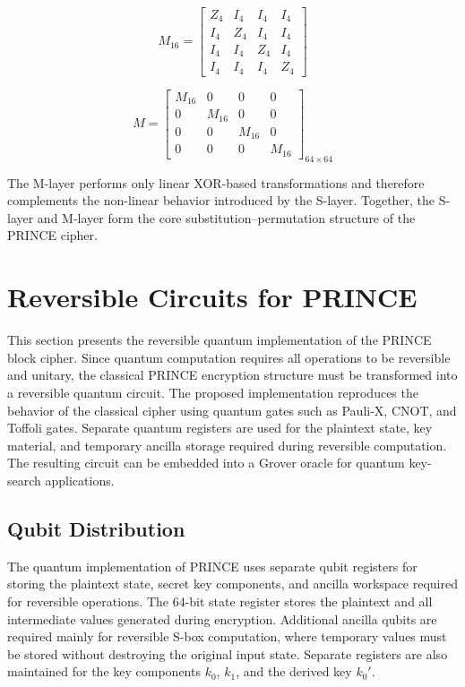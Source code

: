 \documentclass[12pt,a4paper]{report}
\begin{document}
\[
M_{16} =
\begin{bmatrix}
Z_4 & I_4 & I_4 & I_4 \\
I_4 & Z_4 & I_4 & I_4 \\
I_4 & I_4 & Z_4 & I_4 \\
I_4 & I_4 & I_4 & Z_4
\end{bmatrix}
\]

\[
M =
\begin{bmatrix}
M_{16} & 0 & 0 & 0 \\
0 & M_{16} & 0 & 0 \\
0 & 0 & M_{16} & 0 \\
0 & 0 & 0 & M_{16}
\end{bmatrix}_{64 \times 64}
\]

The M-layer performs only linear XOR-based transformations and therefore complements the non-linear behavior introduced by the S-layer. Together, the S-layer and M-layer form the core substitution--permutation structure of the PRINCE cipher.

\section{Reversible Circuits for PRINCE}

This section presents the reversible quantum implementation of the PRINCE block cipher. Since quantum computation requires all operations to be reversible and unitary, the classical PRINCE encryption structure must be transformed into a reversible quantum circuit. The proposed implementation reproduces the behavior of the classical cipher using quantum gates such as Pauli-X, CNOT, and Toffoli gates. Separate quantum registers are used for the plaintext state, key material, and temporary ancilla storage required during reversible computation. The resulting circuit can be embedded into a Grover oracle for quantum key-search applications.

\subsection{Qubit Distribution}

The quantum implementation of PRINCE uses separate qubit registers for storing the plaintext state, secret key components, and ancilla workspace required for reversible operations. The 64-bit state register stores the plaintext and all intermediate values generated during encryption. Additional ancilla qubits are required mainly for reversible S-box computation, where temporary values must be stored without destroying the original input state. Separate registers are also maintained for the key components $k_0$, $k_1$, and the derived key $k_0'$.
\end{document}
